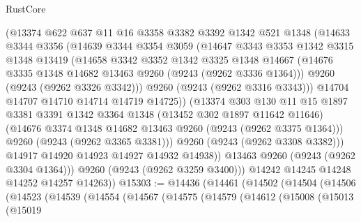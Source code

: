 \begin{lexlean}{RustCore}
\begin{coremodule}
                (@13374
                  @622
                  @637
                  @11
                  @16
                  @3358
                  @3382
                  @3392
                  @1342
                  @521
                  @1348
                  (@14633
                    @3344
                    @3356
                    (@14639
                      @3344
                      @3354
                      @3059
                      (@14647
                        @3343
                        @3353
                        @1342
                        @3315
                        @1348
                        @13419
                        (@14658
                          @3342
                          @3352
                          @1342
                          @3325
                          @1348
                          @14667
                          (@14676 @3335 @1348 @14682 @13463 @9260 (@9243 (@9262 @3336 @1364)))
                          @9260
                          (@9243 (@9262 @3326 @3342)))
                        @9260
                        (@9243 (@9262 @3316 @3343)))
                      @14704
                      @14707
                      @14710
                      @14714
                      @14719
                      @14725))
                  (@13374
                    @303
                    @130
                    @11
                    @15
                    @1897
                    @3381
                    @3391
                    @1342
                    @3364
                    @1348
                    (@13452 @302 @1897 @11642 @11646)
                    (@14676 @3374 @1348 @14682 @13463 @9260 (@9243 (@9262 @3375 @1364)))
                    @9260
                    (@9243 (@9262 @3365 @3381)))
                  @9260
                  (@9243 (@9262 @3308 @3382)))
                @14917
                @14920
                @14923
                @14927
                @14932
                @14938))
            @13463
            @9260
            (@9243 (@9262 @3304 @1364)))
          @9260
          (@9243 (@9262 @3259 @3400)))
        @14242
        @14245
        @14248
        @14252
        @14257
        @14263))
@15303 := @14436
    (@14461
      (@14502
        (@14504
          (@14506
            (@14523
              (@14539
                (@14554
                  (@14567
                    (@14575
                      (@14579
                        (@14612
                          (@15008
                            (@15013
                              (@15019

\end{coremodule}
\end{lexlean}
